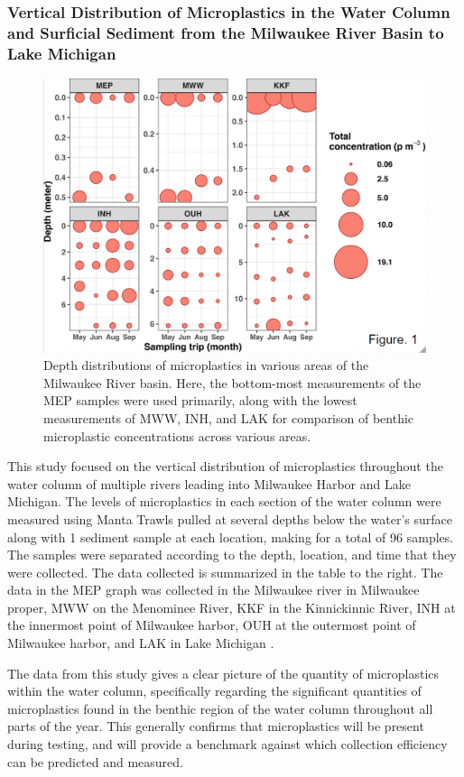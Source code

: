 \documentclass[fleqn,10pt]{SelfArx} %
\begin{document}
	\subsubsection*{Vertical Distribution of Microplastics in the Water Column and Surficial Sediment from the Milwaukee River Basin to Lake Michigan}
		\begin{figure}[H]
		\centering
		\includegraphics[width=0.8\linewidth]{Figures/DepthDistribution.png}
		\caption[Vertical MP Distribution]{Depth distributions of microplastics in various areas of the Milwaukee River basin. Here, the bottom-most measurements of the MEP samples were used primarily, along with the lowest measurements of MWW, INH, and LAK for comparison of benthic microplastic concentrations across various areas.}
		\label{fig:VerticalDepthDist}
	\end{figure}
	This study focused on the vertical distribution of microplastics throughout the water column of multiple rivers leading into Milwaukee Harbor and Lake Michigan. The levels of microplastics in each section of the water column were measured using Manta Trawls pulled at several depths below the water’s surface along with 1 sediment sample at each location, making for a total of 96 samples. The samples were separated according to the depth, location, and time that they were collected. The data collected is summarized in the table to the right. The data in the MEP graph was collected in the Milwaukee river in Milwaukee proper, MWW on the Menominee River, KKF in the Kinnickinnic River, INH at the innermost point of Milwaukee harbor, OUH at the outermost point of Milwaukee harbor, and LAK in Lake Michigan \cite{LenakerEtAlvertdist}.

	The data from this study gives a clear picture of the quantity of microplastics within the water column, specifically regarding the significant quantities of microplastics found in the benthic region of the water column throughout all parts of the year. This generally confirms that microplastics will be present during testing, and will provide a benchmark against which collection efficiency can be predicted and measured.
	
\end{document}
